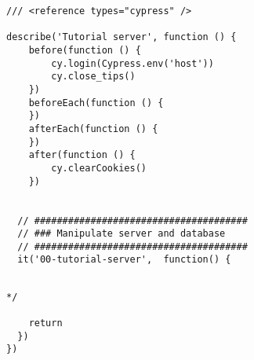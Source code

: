 
\begin{verbatim}
/// <reference types="cypress" />

describe('Tutorial server', function () {
    before(function () {
        cy.login(Cypress.env('host'))
        cy.close_tips()
    })
    beforeEach(function () {
    })
    afterEach(function () {
    })
    after(function () {
        cy.clearCookies()
    })


  // ######################################
  // ### Manipulate server and database
  // ######################################
  it('00-tutorial-server',  function() {


\end{verbatim}



\begin{verbatim}
*/

    return
  })
})

\end{verbatim}
